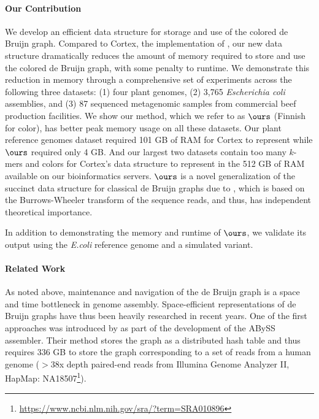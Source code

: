 
\paragraph{Our Contribution}  
We develop an efficient data structure for storage and use of the colored de Bruijn graph. Compared to {\sc Cortex}, the implementation of \cite{ICTFM12}, our new data structure dramatically reduces the amount of memory required to store and use the colored de Bruijn graph, with some penalty to runtime. We demonstrate this reduction in memory through a comprehensive set of experiments across the following three datasets: (1)  four plant genomes, (2) 3,765 {\em Escherichia coli} assemblies,
 and (3) 87 sequenced metagenomic samples from commercial beef production facilities.  We show our method, which we refer to as $\ours$ (Finnish for color), has better peak memory usage on all these datasets. Our plant reference genomes dataset required 101 GB of RAM for  {\sc Cortex} to represent while $\ours$ required only 4 GB.  And  our
largest two datasets contain too many $k$-mers and colors for {\sc Cortex}'s data structure to represent in the 512 GB of RAM available on our bioinformatics servers. $\ours$ is a novel generalization of the succinct data structure for classical de Bruijn graphs due to \cite{BOSS12}, which is based on the Burrows-Wheeler transform of the sequence reads, and thus, has independent theoretical importance.

In addition to demonstrating the memory and runtime of $\ours$, we validate its output using the {\em E.coli} reference genome and a simulated variant.


\paragraph{Related Work} As noted above, maintenance and navigation of the de Bruijn graph is a space and time bottleneck in genome assembly. Space-efficient representations of de Bruijn graphs have thus been heavily researched in recent years. One of the first approaches was introduced by \cite{Simpson:2009} as part of the development of the ABySS assembler.  Their method stores the graph as a distributed hash table and thus requires 336 GB to store the graph corresponding to a set of reads from a human genome ($>$38x depth paired-end reads from Illumina Genome Analyzer II, HapMap: NA18507\footnote{\url{https://www.ncbi.nlm.nih.gov/sra/?term=SRA010896}}). 
 
